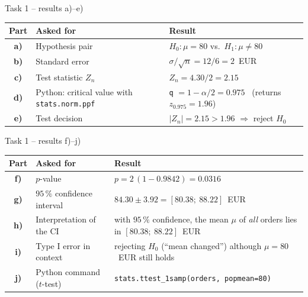 \documentclass[aspectratio=169,11pt]{beamer}
\begin{document}
\begin{frame}{Task 1 -- results a)--e)}
  \begin{center}\small
  \renewcommand{\arraystretch}{1.35}
  \begin{tabular}{@{}c>{\raggedright\arraybackslash}p{4.9cm}>{\raggedright\arraybackslash}p{8.4cm}@{}}
    \toprule Part & Asked for & Result\\ \midrule
    \textbf{a)} & Hypothesis pair & $H_0\colon \mu = 80$ vs.\ $H_1\colon \mu \neq 80$\\
    \textbf{b)} & Standard error & $\sigma/\sqrt{n} = 12/6 = 2$~EUR\\
    \textbf{c)} & Test statistic $Z_n$ & $Z_n = 4.30/2 = 2.15$\\
    \textbf{d)} & Python: critical value with \texttt{stats.norm.ppf} & \texttt{q} $= 1-\alpha/2 = 0.975$ \ (returns $z_{0.975} = 1.96$)\\
    \textbf{e)} & Test decision & $|Z_n| = 2.15 > 1.96$ $\Rightarrow$ reject $H_0$\\
    \bottomrule
  \end{tabular}
  \end{center}
\end{frame}

\begin{frame}{Task 1 -- results f)--j)}
  \begin{center}\small
  \renewcommand{\arraystretch}{1.35}
  \begin{tabular}{@{}c>{\raggedright\arraybackslash}p{4.9cm}>{\raggedright\arraybackslash}p{8.4cm}@{}}
    \toprule Part & Asked for & Result\\ \midrule
    \textbf{f)} & $p$-value & $p = 2\,(1-0.9842) = 0.0316$\\
    \textbf{g)} & $95\,\%$ confidence interval & $84.30 \pm 3.92 = [80.38;\ 88.22]$~EUR\\
    \textbf{h)} & Interpretation of the CI & with $95\,\%$ confidence, the mean $\mu$ of \emph{all} orders lies in $[80.38;\ 88.22]$~EUR\\
    \textbf{i)} & Type I error in context & rejecting $H_0$ (``mean changed'') although $\mu = 80$~EUR still holds\\
    \textbf{j)} & Python command ($t$-test) & \texttt{stats.ttest\_1samp(orders, popmean=80)}\\
    \bottomrule
  \end{tabular}
  \end{center}
\end{frame}
\end{document}
